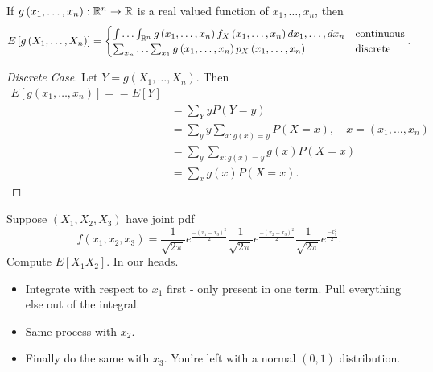 \begin{theorem}
	If $g\left( x_{1} , \ldots , x_{n} \right) : \mathbb{R}^{n} \to \mathbb{R}$ is a real valued function of $x_{1} , \ldots , x_{n}$, then
	\begin{align*}
		E\left[ g\left( X_{1} , \ldots , X_{n} \right)  \right] = \begin{cases}
			\int \ldots \int_{\mathbb{R}^{n}} g\left( x_{1} , \ldots , x_{n} \right)  f_{X}\left( x_{1} , \ldots , x_{n} \right) dx_{1} , \ldots , dx_{n} & \text{continuous} \\
			\sum_{x_{n}}^{ }  \ldots \sum_{x_1}^{ } g\left( x_{1} , \ldots , x_{n} \right) p_{X}\left( x_{1} , \ldots , x_{n} \right)  & \text{discrete}
		\end{cases}
	.\end{align*}
	\begin{proof}[Discrete Case]
		Let $Y = g\left( X_{1} , \ldots , X_{n} \right) $. Then 
		\begin{align*}
			E\left[ g\left( x_{1} , \ldots , x_{n} \right)  \right]  == E\left[ Y \right] \\
			&= \sum_{Y} y P\left( Y = y \right)  \\
			&= \sum_{y}^{ } y \sum_{x:g\left( x \right)  = y} P\left( X = x \right) , \quad x = ( x_{1} , \ldots , x_{n}) \\
			&= \sum_{y}^{ } \sum_{x: g\left( x \right) = y} g\left( x \right) P\left( X = x \right)  \\
			&=\sum_{x} g\left( x \right) P\left( X = x \right)
		.\end{align*}
	\end{proof}
\end{theorem}

\begin{example}
	Suppose $\left( X_1, X_2 ,X_3  \right) $ have joint pdf 
	\[
		f\left( x_1, x_2, x_3 \right) = \frac{1}{\sqrt{2 \pi} }e^{\frac{-\left( x_1 - x_3 \right) ^2}{2 }} \frac{1}{\sqrt{2 \pi} }e^{\frac{-\left( x_2 - x_3 \right) ^2}{2 }}  \frac{1}{\sqrt{2 \pi} }e^{\frac{- x_3  ^2}{2 }} 
	.\] 
	Compute $E\left[ X_1 X_2 \right] $. In our heads. 
	\begin{itemize}
		\item Integrate with respect to $x_1$ first - only present in one term. Pull everything else out of the integral.
		\item Same process with $x_2$. 
		\item Finally do the same with $x_{3}$. You're left with a normal $(0, 1)$ distribution. 
	\end{itemize}
\end{example}

